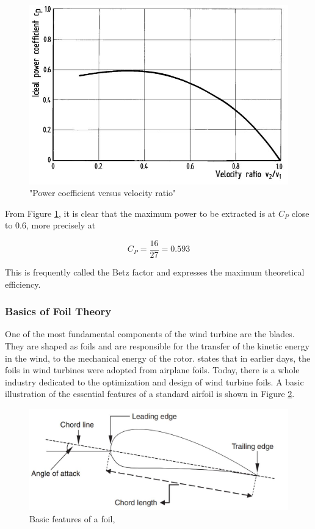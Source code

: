 \begin{figure}[H]
\centering
\includegraphics[scale=0.6]{figures/idealflow}
\caption[$\; \:$Power coefficient versus velocity ratio]{"Power coefficient versus velocity ratio" \cite{Hau2013} }
 \label{fig:idealflow}
\end{figure}

\noindent  From Figure \ref{fig:idealflow}, it is clear that the maximum power to be extracted is at $C_P$ close to 0.6, more precisely at 

 \begin{equation}
    C_P = \frac{16}{27} = 0.593
\end{equation}

\noindent This is frequently called the Betz factor and expresses the maximum theoretical efficiency. 

\subsubsection{Basics of Foil Theory}
One of the most fundamental components of the wind turbine are the blades. They are shaped as foils and are responsible for the transfer of the kinetic energy in the wind, to the mechanical energy of the rotor. \cite{MATHEW2012} states that in earlier days, the foils in wind turbines were adopted from airplane foils. Today,  there is a whole industry dedicated to the optimization and design of wind turbine foils. A basic illustration of the essential features of a standard airfoil is shown in Figure \ref{fig:foil}.  

\begin{figure}[H]
\centering
\includegraphics[scale=0.6]{figures/foil}
\caption[$\; \:$Basic features of a foil]{Basic features of a foil, \cite{MATHEW2012} }
 \label{fig:foil}
\end{figure}

